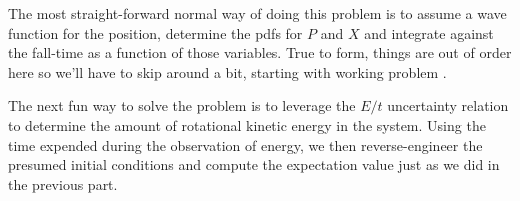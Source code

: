 \begin{purpose}
  \begin{questionpart}
    The most straight-forward normal way of doing this problem is to
    assume a wave function for the position, determine the \acp{pdf}
    for $P$ and $X$ and integrate against the fall-time as a function
    of those variables.  True to form, things are out of order here so
    we'll have to skip around a bit, starting with working problem
    .
  \end{questionpart}

  \begin{questionpart}
    The next fun way to solve the problem is to leverage the $E/t$
    uncertainty relation to determine the amount of rotational kinetic
    energy in the system.  Using the time expended during the
    observation of energy, we then reverse-engineer the presumed
    initial conditions and compute the expectation value just as we did
    in the previous part.
  \end{questionpart}

\end{purpose}

